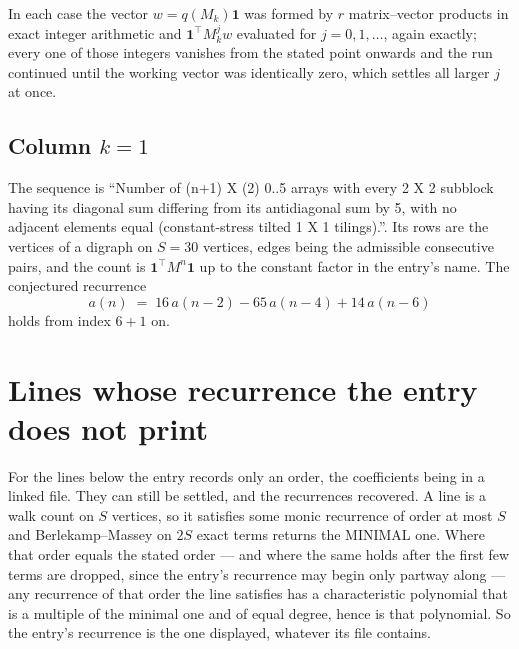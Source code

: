 \documentclass[11pt,a4paper]{article}
\theoremstyle{plain}
\theoremstyle{definition}
\begin{document}
In each case the vector $w=q(M_k)\mathbf{1}$ was formed by $r$ matrix--vector products in
exact integer arithmetic and $\mathbf{1}^{\!\top}M_k^{j}w$ evaluated for $j=0,1,\dots$,
again exactly; every one of those integers vanishes from the stated point onwards and the run
continued until the working vector was identically zero, which settles all larger $j$ at once.

\subsection*{Column $k$$=1$}
The sequence is ``Number of (n+1) X (2) 0..5 arrays with every 2 X 2 subblock having its diagonal sum differing from its antidiagonal sum by 5, with no adjacent elements equal (constant-stress tilted 1 X 1 tilings).''. Its rows are the vertices of a digraph on
$S=30$ vertices, edges being the admissible consecutive pairs, and the count is
$\mathbf{1}^{\!\top}M^{n}\mathbf{1}$ up to the constant factor in the entry's name.
The conjectured recurrence
\[
a(n)\;=\;16\,a(n-2) - 65\,a(n-4) + 14\,a(n-6)
\]
holds from index $6+1$ on.


\section{Lines whose recurrence the entry does not print}

For the lines below the entry records only an order, the coefficients being in a linked file.
They can still be settled, and the recurrences recovered. A line is a walk count on $S$
vertices, so it satisfies some monic recurrence of order at most $S$ and Berlekamp--Massey on
$2S$ exact terms returns the MINIMAL one. Where that order equals the stated order --- and
where the same holds after the first few terms are dropped, since the entry's recurrence may
begin only partway along --- any recurrence of that order the line satisfies has a
characteristic polynomial that is a multiple of the minimal one and of equal degree, hence is
that polynomial. So the entry's recurrence is the one displayed, whatever its file contains.
\end{document}
